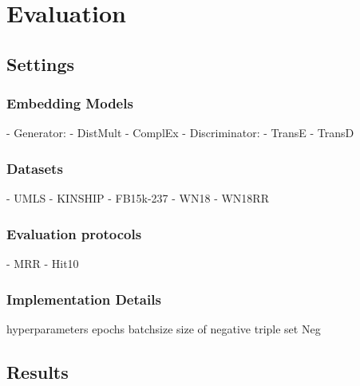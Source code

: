 \chapter{Evaluation}
\label{ch:evaluation}





\section{Settings}

\subsection{Embedding Models}
- Generator:
    - DistMult
    - ComplEx
- Discriminator:
    - TransE
    - TransD
    
    
\subsection{Datasets}

- UMLS
- KINSHIP
- FB15k-237
- WN18
- WN18RR


\subsection{Evaluation protocols}

- MRR
- Hit\@10

\subsection{Implementation Details}
hyperparameters
epochs
batchsize
size of negative triple set Neg

\section{Results}


